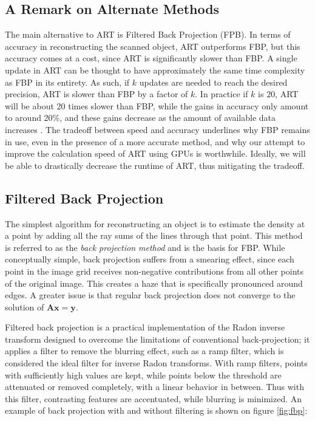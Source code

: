 \subsection{A Remark on Alternate Methods}
The main alternative to ART is Filtered Back Projection (FPB). In terms of accuracy in reconstructing the scanned object, ART outperforms FBP, but this accuracy comes at a cost, since ART is significantly slower than FBP. A single update in ART can be thought to have approximately the same time complexity as FBP in its entirety. 
As such, if $k$ updates are needed to reach the desired precision, ART is slower than FBP by a factor of $k$. In practice if $k$ is $20$, ART will be about 20 times slower than FBP, while the gains in accuracy only amount to around 20\%, and these gains decrease as the amount of available data increases \cite[p.~219]{FCT}\cite[p.~210]{FCT}. The tradeoff between speed and accuracy underlines why FBP remains in use, even in the presence of a more accurate method, and why our attempt to improve the calculation speed of ART using GPUs is worthwhile. Ideally, we will be able to drastically decrease the runtime of ART, thus mitigating the tradeoff. 

\subsection{Filtered Back Projection}
The simplest algorithm for reconstructing an object is to estimate the density at a point by adding all the ray sums of the lines through that point. This method is referred to as the \textit{back projection method} and is the basis for FBP. While conceptually simple, back projection suffers from a smearing effect, since each point in the image grid receives non-negative contributions from all other points of the original image. This creates a haze that is specifically pronounced around edges. A greater issue is that regular back projection does not converge to the solution of $\mathbf{Ax}=\mathbf{y}$.

Filtered back projection is a practical implementation of the Radon inverse transform designed to overcome the limitations of conventional back-projection; it applies a filter to remove the blurring effect, such as a ramp filter, which is considered the ideal filter for inverse Radon transforms. With ramp filters, points with sufficiently high values are kept, while points below the threshold are attenuated or removed completely, with a linear behavior in between. Thus with this filter, contrasting features are accentuated, while blurring is minimized. An example of back projection with and without filtering is shown on figure \ref{fig:fbp}:

